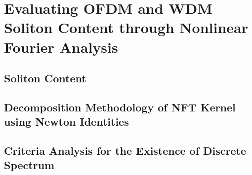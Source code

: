 \chapter{Evaluating OFDM and WDM Soliton Content through Nonlinear Fourier Analysis}

\section{Soliton Content}

\lipsum[1]

\section{Decomposition Methodology of NFT Kernel using Newton Identities}

\lipsum[1]

\section{Criteria Analysis for the Existence of Discrete Spectrum}

\lipsum[1]